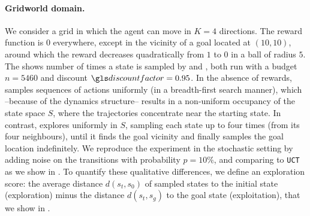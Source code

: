\paragraph{Gridworld domain.}
We consider a grid in which the agent can move in $K=4$ directions. The reward function is $0$ everywhere, except in the vicinity of a goal located at $(10, 10)$, around which the reward decreases quadratically from $1$ to $0$ in a ball of radius $5$. %
The  shows number of times a state is sampled by \OPD and \GBOPD, both run with a budget $n = 5460$ and discount $\discount=0.95$. In the absence of rewards, \OPD samples sequences of actions uniformly (in a breadth-first search manner), which --because of the dynamics structure-- results in a non-uniform occupancy of the state space $S$, where the trajectories concentrate near the starting state. In contrast, \GBOPD explores uniformly in $S$, sampling each state up to four times (from its four  neighbours), until it finds the goal vicinity and finally samples the goal location indefinitely. We reproduce the experiment in the stochastic setting by adding noise on the transitions with probability $p=10\%$, and comparing \GBOP to \texttt{UCT} as we show in . To quantify these qualitative differences, we define an exploration score: the average distance $d(s_t, s_0)$ of sampled states to the initial state (exploration) minus the distance $d(s_t, s_g)$ to the goal state (exploitation), that we show in .

